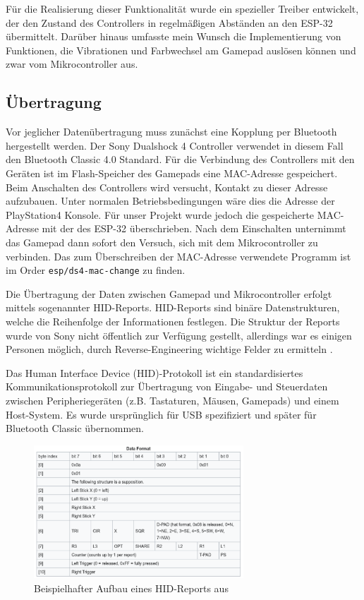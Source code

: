 Für die Realisierung dieser Funktionalität wurde ein spezieller Treiber entwickelt, der den Zustand des Controllers in regelmäßigen Abständen an den ESP-32 übermittelt. 
Darüber hinaus umfasste mein Wunsch die Implementierung von Funktionen, die Vibrationen und Farbwechsel am Gamepad auslösen können und zwar vom Mikrocontroller aus.

\subsection{Übertragung}

Vor jeglicher Datenübertragung muss zunächst eine Kopplung per Bluetooth hergestellt werden. 
Der Sony Dualshock 4 Controller verwendet in diesem Fall den Bluetooth Classic 4.0 Standard.
Für die Verbindung des Controllers mit den Geräten ist im Flash-Speicher des Gamepads eine MAC-Adresse gespeichert. 
Beim Anschalten des Controllers wird versucht, Kontakt zu dieser Adresse aufzubauen.
Unter normalen Betriebsbedingungen wäre dies die Adresse der PlayStation4 Konsole. 
Für unser Projekt wurde jedoch die gespeicherte MAC-Adresse mit der des ESP-32 überschrieben.
Nach dem Einschalten unternimmt das Gamepad dann sofort den Versuch, sich mit dem Mikrocontroller zu verbinden.
Das zum Überschreiben der MAC-Adresse verwendete Programm ist im Order \texttt{esp/ds4-mac-change} zu finden.

Die Übertragung der Daten zwischen Gamepad und Mikrocontroller erfolgt mittels sogenannter HID-Reports.
HID-Reports sind binäre Datenstrukturen, welche die Reihenfolge der Informationen festlegen.
Die Struktur der Reports wurde von Sony nicht öffentlich zur Verfügung gestellt, allerdings war es einigen Personen möglich, durch Reverse-Engineering wichtige Felder zu ermitteln \cite{esp_ds4_hid_reports}.

Das Human Interface Device (HID)-Protokoll ist ein standardisiertes Kommunikationsprotokoll zur Übertragung von Eingabe- und Steuerdaten zwischen Peripheriegeräten (z.B. Tastaturen, Mäusen, Gamepads) und einem Host-System. 
Es wurde ursprünglich für USB spezifiziert \cite{esp_usb_hid_spec} und später für Bluetooth Classic übernommen.

\begin{figure}[ht]
    \centering
    \includegraphics[width=0.7\textwidth]{images/becker_esp32_ds4_report.png}
    \caption{Beispielhafter Aufbau eines HID-Reports aus \cite{esp_ds4_hid_reports}}
\end{figure}

